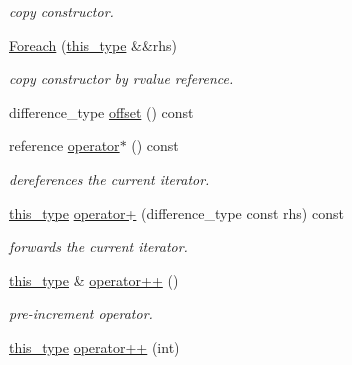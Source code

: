 \begin{DoxyCompactItemize}
\begin{DoxyCompactList}\small\item\em copy constructor. \end{DoxyCompactList}\item 
\hypertarget{classhryky_1_1_foreach_a135d90ee04a04f300032795ef9ed095d}{\hyperlink{classhryky_1_1_foreach_a135d90ee04a04f300032795ef9ed095d}{Foreach} (\hyperlink{classhryky_1_1_foreach_a57418e3f3130d8e58f62b54d6c209798}{this\-\_\-type} \&\&rhs)}\label{classhryky_1_1_foreach_a135d90ee04a04f300032795ef9ed095d}

\begin{DoxyCompactList}\small\item\em copy constructor by rvalue reference. \end{DoxyCompactList}\item 
difference\-\_\-type \hyperlink{classhryky_1_1_foreach_aab1aceaecb09f71b9ba33ca9ceb49fb1}{offset} () const 
\item 
\hypertarget{classhryky_1_1_foreach_a20deebc90d417dacd6052ffab3bf03e2}{reference \hyperlink{classhryky_1_1_foreach_a20deebc90d417dacd6052ffab3bf03e2}{operator$\ast$} () const }\label{classhryky_1_1_foreach_a20deebc90d417dacd6052ffab3bf03e2}

\begin{DoxyCompactList}\small\item\em dereferences the current iterator. \end{DoxyCompactList}\item 
\hypertarget{classhryky_1_1_foreach_a7e92bdcb9a54fe6a1713e6e23fb3fa56}{\hyperlink{classhryky_1_1_foreach_a57418e3f3130d8e58f62b54d6c209798}{this\-\_\-type} \hyperlink{classhryky_1_1_foreach_a7e92bdcb9a54fe6a1713e6e23fb3fa56}{operator+} (difference\-\_\-type const rhs) const }\label{classhryky_1_1_foreach_a7e92bdcb9a54fe6a1713e6e23fb3fa56}

\begin{DoxyCompactList}\small\item\em forwards the current iterator. \end{DoxyCompactList}\item 
\hypertarget{classhryky_1_1_foreach_a630beb6360fa3cabbb602d80cd5f5b44}{\hyperlink{classhryky_1_1_foreach_a57418e3f3130d8e58f62b54d6c209798}{this\-\_\-type} \& \hyperlink{classhryky_1_1_foreach_a630beb6360fa3cabbb602d80cd5f5b44}{operator++} ()}\label{classhryky_1_1_foreach_a630beb6360fa3cabbb602d80cd5f5b44}

\begin{DoxyCompactList}\small\item\em pre-\/increment operator. \end{DoxyCompactList}\item 
\hypertarget{classhryky_1_1_foreach_a1e142eef50ffce824c28e6d0ede15c63}{\hyperlink{classhryky_1_1_foreach_a57418e3f3130d8e58f62b54d6c209798}{this\-\_\-type} \hyperlink{classhryky_1_1_foreach_a1e142eef50ffce824c28e6d0ede15c63}{operator++} (int)}\label{classhryky_1_1_foreach_a1e142eef50ffce824c28e6d0ede15c63}


\end{DoxyCompactItemize}
